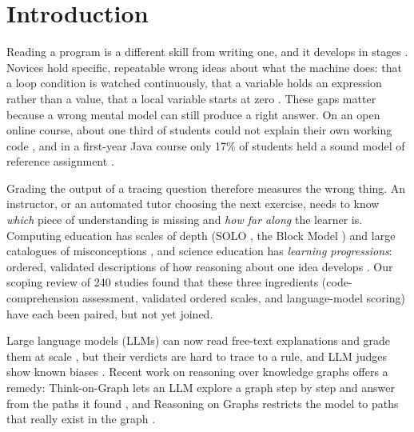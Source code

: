 \documentclass[sigconf,nonacm]{acmart}
\begin{document}
\section{Introduction}
Reading a program is a different skill from writing one, and it develops in stages
\cite{lister2004multinational,lister2006forest}. Novices hold specific, repeatable wrong ideas about what
the machine does: that a loop condition is watched continuously, that a variable holds an expression rather
than a value, that a local variable starts at zero \cite{pea1986bugs,duboulay1986difficulties,sorva2013notional}.
These gaps matter because a wrong mental model can still produce a right answer. On an open online course,
about one third of students could not explain their own working code \cite{lehtinen2021explain}, and in a
first-year Java course only 17\% of students held a sound model of reference assignment \cite{ma2007viability}.

Grading the output of a tracing question therefore measures the wrong thing. An instructor, or an automated
tutor choosing the next exercise, needs to know \emph{which} piece of understanding is missing and \emph{how
far along} the learner is. Computing education has scales of depth (SOLO \cite{biggs1982solo}, the Block
Model \cite{schulte2008block}) and large catalogues of misconceptions \cite{qian2017misconceptions,chiodini2021progmiscon},
and science education has \emph{learning progressions}: ordered, validated descriptions of how reasoning about
one idea develops \cite{krajcik2023progressions,wilson2009measuring}. Our scoping review of 240 studies
\cite{nair2026scoping} found that these three ingredients (code-comprehension assessment, validated ordered
scales, and language-model scoring) have each been paired, but not yet joined.

Large language models (LLMs) can now read free-text explanations and grade them at scale
\cite{fowler2021autograding,zhang2025solo,prather2023robots}, but their verdicts are hard to trace to a rule, and LLM judges show known biases \cite{zheng2023judging}.
Recent work on reasoning over knowledge graphs offers a remedy: Think-on-Graph lets an LLM explore a graph
step by step and answer from the paths it found \cite{sun2024tog}, and Reasoning on Graphs restricts the model to
paths that really exist in the graph \cite{luo2024rog}.
\end{document}
